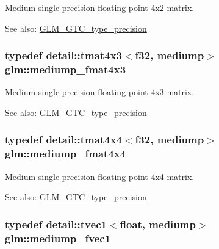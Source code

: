 Medium single-precision floating-point 4x2 matrix. \begin{Desc}
\item[See also:]\hyperlink{group__gtc__type__precision}{GLM\_\-GTC\_\-type\_\-precision} \end{Desc}
\hypertarget{group__gtc__type__precision_g5e5de428d1e1da2c593a6245d92dd8c0}{
\subsubsection[mediump\_\-fmat4x3]{\setlength{\rightskip}{0pt plus 5cm}typedef detail::tmat4x3$<$f32, mediump$>$ {\bf glm::mediump\_\-fmat4x3}}}
\label{group__gtc__type__precision_g5e5de428d1e1da2c593a6245d92dd8c0}


Medium single-precision floating-point 4x3 matrix. \begin{Desc}
\item[See also:]\hyperlink{group__gtc__type__precision}{GLM\_\-GTC\_\-type\_\-precision} \end{Desc}
\hypertarget{group__gtc__type__precision_g7f4ae9d05ca94005a0b7d8e3c59943cd}{
\subsubsection[mediump\_\-fmat4x4]{\setlength{\rightskip}{0pt plus 5cm}typedef detail::tmat4x4$<$f32, mediump$>$ {\bf glm::mediump\_\-fmat4x4}}}
\label{group__gtc__type__precision_g7f4ae9d05ca94005a0b7d8e3c59943cd}


Medium single-precision floating-point 4x4 matrix. \begin{Desc}
\item[See also:]\hyperlink{group__gtc__type__precision}{GLM\_\-GTC\_\-type\_\-precision} \end{Desc}
\hypertarget{group__gtc__type__precision_g4534af301d5260974cee29f76842d579}{
\subsubsection[mediump\_\-fvec1]{\setlength{\rightskip}{0pt plus 5cm}typedef detail::tvec1$<$float, mediump$>$ {\bf glm::mediump\_\-fvec1}}}
\label{group__gtc__type__precision_g4534af301d5260974cee29f76842d579}



